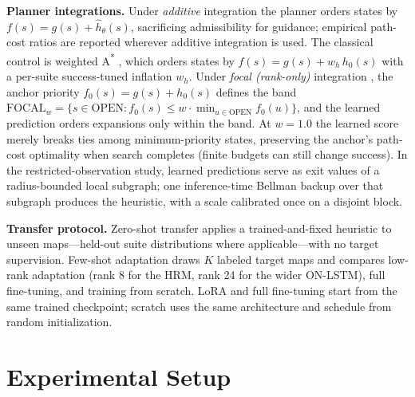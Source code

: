 \documentclass[letterpaper]{article} %
\begin{document}
\textbf{Planner integrations.} Under \emph{additive} integration the planner orders states by $f(s) = g(s) + \hat h_\theta(s)$, sacrificing admissibility for guidance; empirical path-cost ratios are reported wherever additive integration is used. The classical control is weighted A\textsuperscript{*} \citep{pohl1970}, which orders states by $f(s) = g(s) + w_h\, h_0(s)$ with a per-suite success-tuned inflation $w_h$. Under \emph{focal (rank-only)} integration \citep{pohl1970,pearl1982semiadmissible}, the anchor priority $f_0(s) = g(s) + h_0(s)$ defines the band $\mathrm{FOCAL}_w = \{ s \in \mathrm{OPEN} : f_0(s) \leq w \cdot \min_{u \in \mathrm{OPEN}} f_0(u) \}$, and the learned prediction orders expansions only within the band. At $w{=}1.0$ the learned score merely breaks ties among minimum-priority states, preserving the anchor's path-cost optimality when search completes (finite budgets can still change success). In the restricted-observation study, learned predictions serve as exit values of a radius-bounded local subgraph; one inference-time Bellman backup over that subgraph produces the heuristic, with a scale calibrated once on a disjoint block.

\textbf{Transfer protocol.} Zero-shot transfer applies a trained-and-fixed heuristic to unseen maps---held-out suite distributions where applicable---with no target supervision. Few-shot adaptation draws $K$ labeled target maps and compares low-rank adaptation \citep[LoRA;][]{hu2021lora} (rank 8 for the HRM, rank 24 for the wider ON-LSTM), full fine-tuning, and training from scratch. LoRA and full fine-tuning start from the same trained checkpoint; scratch uses the same architecture and schedule from random initialization.

\section{Experimental Setup}
\end{document}
